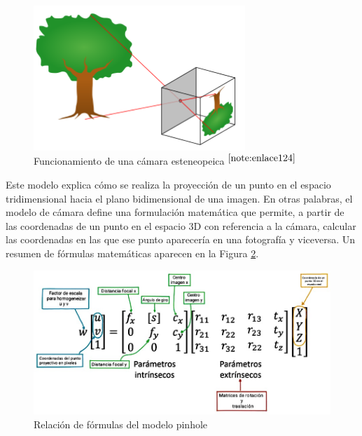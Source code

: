  \begin{figure} [h!]
	\begin{center}
		\includegraphics[width=8cm]{figs/cap6/pinhole.png}
	\end{center}
	\caption{Funcionamiento de una cámara esteneopeica $^{\ref{note:enlace124}}$}
	\label{fig:pinhole}
\end{figure}

\setcounter{footnote}{124} %


Este modelo explica cómo se realiza la proyección de un punto en el espacio tridimensional hacia el plano bidimensional de una imagen. En otras palabras, el modelo de cámara define una formulación matemática que permite, a partir de las coordenadas de un punto en el espacio 3D con referencia a la cámara, calcular las coordenadas en las que ese punto aparecería en una fotografía y viceversa. Un resumen de fórmulas matemáticas aparecen en la Figura \ref{fig:pinholeformula}.

 \begin{figure} [h!]
	\begin{center}
		\includegraphics[width=15cm]{figs/cap6/esquema_pinhole_matrices.jpg}
	\end{center}
	\caption{Relación de fórmulas del modelo pinhole}
	\label{fig:pinholeformula}
\end{figure}
  
